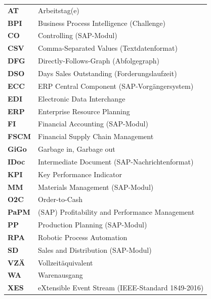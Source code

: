 {\small
\begin{longtable}{@{}>{\bfseries}l l@{}}
\toprule
AT & Arbeitstag(e) \\
BPI & Business Process Intelligence (Challenge) \\
CO & Controlling (SAP-Modul) \\
CSV & Comma-Separated Values (Textdatenformat) \\
DFG & Directly-Follows-Graph (Abfolgegraph) \\
DSO & Days Sales Outstanding (Forderungslaufzeit) \\
ECC & ERP Central Component (SAP-Vorgängersystem) \\
EDI & Electronic Data Interchange \\
ERP & Enterprise Resource Planning \\
FI & Financial Accounting (SAP-Modul) \\
FSCM & Financial Supply Chain Management \\
GiGo & Garbage in, Garbage out \\
IDoc & Intermediate Document (SAP-Nachrichtenformat) \\
KPI & Key Performance Indicator \\
MM & Materials Management (SAP-Modul) \\
O2C & Order-to-Cash \\
PaPM & (SAP) Profitability and Performance Management \\
PP & Production Planning (SAP-Modul) \\
RPA & Robotic Process Automation \\
SD & Sales and Distribution (SAP-Modul) \\
VZÄ & Vollzeitäquivalent \\
WA & Warenausgang \\
XES & eXtensible Event Stream (IEEE-Standard 1849-2016) \\
\bottomrule
\end{longtable}}
